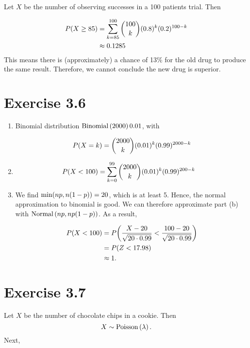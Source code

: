 \documentclass[12pt,letterpaper,reqno]{amsart}
\numberwithin{equation}{subsection}
\begin{document}
Let $X$ be the number of observing successes in a 100 patients trial. Then

\begin{align*}
    {P}\! \left( {X \geq 85} \right) &= \sum_{k=85}^{100} \binom{100}{k}(0.8)^k (0.2)^{100-k} \\
    &\approx 0.1285
\end{align*}
This means there is (approximately) a chance of 13\% for the old drug to produce the same result. Therefore, we cannot conclude the new drug is superior.

\newpage
\section{Exercise 3.6}

\begin{enumerate}[label=(\alph*),leftmargin=*]
    \item Binomial distribution $\operatorname{Binomial}\left( {2000}\right){0.01}$, with
    
    \[ {P}\! \left( {X = k} \right) = \binom{2000}{k} (0.01)^k (0.99)^{2000-k} \]
    
    \item
    
    \begin{align*}
        {P}\! \left( {X < 100} \right) &= \sum_{k=0}^{99} \binom{2000}{k}(0.01)^k (0.99)^{200-k}
    \end{align*}
    
    \item We find ${\min}\! \left( {np, n(1-p)} \right) = 20$, which is at least 5. Hence, the normal approximation to binomial is good. We can therefore approximate part (b) with $\operatorname{Normal}\left( {np, np(1-p)} \right)$. As a result,
    
    \begin{align*}
        {P}\! \left( {X < 100} \right) &= {P}\! \left( {\frac{X - 20}{\sqrt{20 \cdot 0.99}} < \frac{100 - 20}{\sqrt{20 \cdot 0.99}}} \right) \\
        &= {P}\! \left( {Z < 17.98} \right) \\
        &\approx 1.
    \end{align*}
\end{enumerate}

\newpage
\section{Exercise 3.7}

Let $X$ be the number of chocolate chips in a cookie. Then
\[ X \sim \operatorname{Poisson}\left( {\lambda} \right). \]
Next,
\end{document}
